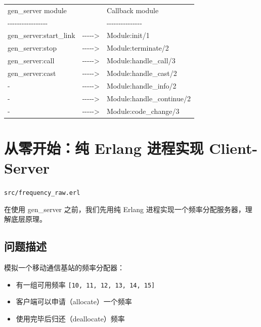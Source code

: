\documentclass[a4paper,11pt]{article}
\begin{document}
\begin{tcolorbox}[colback=codebg, colframe=codeborder, arc=2mm, boxrule=0.5pt,
                  title={\textbf{gen\_server.erl --- Work Flow}},
                  fonttitle=\bfseries\ttfamily, width=\textwidth]
\small\ttfamily
\begin{tabular}{@{}lcl@{}}
gen\_server module &  & Callback module \\
\textsf{-{}-{}-{}-{}-{}-{}-{}-{}-{}-{}-{}-{}-{}-{}-{}-{}-} & & \textsf{-{}-{}-{}-{}-{}-{}-{}-{}-{}-{}-{}-{}-{}-{}-} \\
gen\_server:start\_link & -{}-{}-{}-{}-> & Module:init/1 \\
gen\_server:stop       & -{}-{}-{}-{}-> & Module:terminate/2 \\
gen\_server:call       & -{}-{}-{}-{}-> & Module:handle\_call/3 \\
gen\_server:cast       & -{}-{}-{}-{}-> & Module:handle\_cast/2 \\
-                     & -{}-{}-{}-{}-> & Module:handle\_info/2 \\
-                     & -{}-{}-{}-{}-> & Module:handle\_continue/2 \\
-                     & -{}-{}-{}-{}-> & Module:code\_change/3 \\
\end{tabular}
\end{tcolorbox}


\section{从零开始：纯 Erlang 进程实现 Client-Server}

\begin{notebox}[源码文件]
\texttt{src/frequency\_raw.erl}
\end{notebox}

在使用 gen\_server 之前，我们先用纯 Erlang 进程实现一个频率分配服务器，理解底层原理。

\subsection{问题描述}

模拟一个移动通信基站的频率分配器：
\begin{itemize}[leftmargin=2em]
    \item 有一组可用频率 \texttt{[10, 11, 12, 13, 14, 15]}
    \item 客户端可以申请（allocate）一个频率
    \item 使用完毕后归还（deallocate）频率
\end{itemize}
\end{document}
